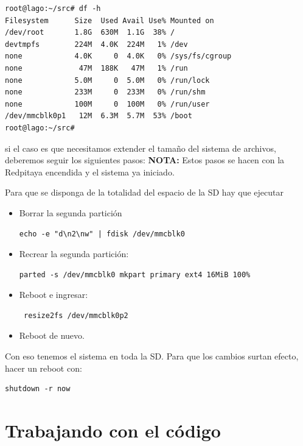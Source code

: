 \documentclass[a4paper,11pt]{article}
\begin{document}
\begin{verbatim}
root@lago:~/src# df -h
Filesystem      Size  Used Avail Use% Mounted on
/dev/root       1.8G  630M  1.1G  38% /
devtmpfs        224M  4.0K  224M   1% /dev
none            4.0K     0  4.0K   0% /sys/fs/cgroup
none             47M  188K   47M   1% /run
none            5.0M     0  5.0M   0% /run/lock
none            233M     0  233M   0% /run/shm
none            100M     0  100M   0% /run/user
/dev/mmcblk0p1   12M  6.3M  5.7M  53% /boot
root@lago:~/src# 

\end{verbatim}

\noindent si el caso es que necesitamos extender el tamaño del sistema de
archivos, deberemos seguir los siguientes pasos: 
\textbf{NOTA:} Estos pasos se hacen con la Redpitaya encendida y el sistema ya
iniciado.

\noindent Para que se disponga de la totalidad del espacio de la SD hay que ejecutar
\begin{itemize}
\item Borrar la segunda partición
\begin{verbatim}
echo -e "d\n2\nw" | fdisk /dev/mmcblk0
\end{verbatim}

\item Recrear la segunda partición:
\begin{verbatim}
parted -s /dev/mmcblk0 mkpart primary ext4 16MiB 100%
\end{verbatim}

\item Reboot e ingresar:
\begin{verbatim}
 resize2fs /dev/mmcblk0p2
\end{verbatim}

\item Reboot de nuevo.
\end{itemize}

\noindent Con eso tenemos el sistema en toda la SD. Para que los cambios surtan
efecto, hacer un reboot con: 
\begin{verbatim}
shutdown -r now
\end{verbatim}

\section{Trabajando con el código}
\end{document}
